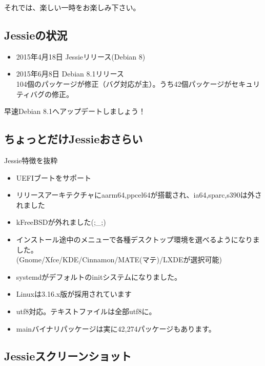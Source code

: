 \documentclass[mingoth,a4paper]{jsarticle}
\begin{document}
 それでは、楽しい一時をお楽しみ下さい。
 

\subsection{Jessieの状況}
  
\begin{itemize}
\item 2015年4月18日 Jessieリリース(Debian 8)
\item 2015年6月8日 Debian 8.1リリース\\
      104個のパッケージが修正（バグ対応が主）。うち42個パッケージがセキュリティバグの修正。
\end{itemize}

  \begin{center}
    \LARGE 早速Debian 8.1へアップデートしましょう！
  \end{center}
  

\subsection{ちょっとだけJessieおさらい}

 Jessie特徴を抜粋

 \begin{itemize} 
 \item UEFIブートをサポート
 \item リリースアーキテクチャにaarm64,ppcel64が搭載され、ia64,sparc,s390は外されました
 \item kFreeBSDが外れました(;\_;)
 \item インストール途中のメニューで各種デスクトップ環境を選べるようになりました。\\
 (Gnome/Xfce/KDE/Cinnamon/MATE(マテ)/LXDEが選択可能)
 \item systemdがデフォルトのinitシステムになりました。
 \item Linuxは3.16.x版が採用されています
 \item utf8対応。テキストファイルは全部utf8に。
 \item mainバイナリパッケージは実に42,274パッケージもあります。
 \end{itemize}

\clearpage

\subsection{Jessieスクリーンショット}
\end{document}
